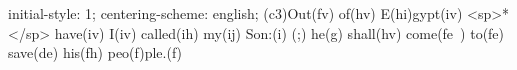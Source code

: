 initial-style: 1;
centering-scheme: english;
(c3)Out(fv) of(hv) E(hi)gypt(iv) <sp>*</sp> have(iv) I(iv) called(ih) my(ij) Son:(i) (;) he(g) shall(hv) come(fe~) to(fe) save(de) his(fh) peo(f)ple.(f)

